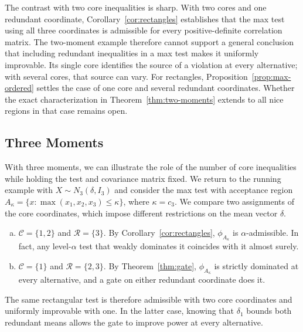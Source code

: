 \documentclass[11pt]{article}
\newcommand{\red}[1]{{\color{red}#1}} %
\numberwithin{equation}{section}
\theoremstyle{definition}
\begin{document}
The contrast with two core inequalities is sharp. With two cores and one redundant coordinate, Corollary~\ref{cor:rectangles} establishes that the max test using all three coordinates is admissible for every positive-definite correlation matrix. The two-moment example therefore cannot support a general conclusion that including redundant inequalities in a max test makes it uniformly improvable. Its single core identifies the source of a violation at every alternative; with several cores, that source can vary. \red{For rectangles, Proposition~\ref{prop:max-ordered} settles the case of one core and several redundant coordinates. Whether the exact characterization in Theorem~\ref{thm:two-moments} extends to all nice regions in that case remains open.}

\subsection{Three Moments}\label{sec:three-moments}

With three moments, we can illustrate the role of the number of core inequalities while holding the test and covariance matrix fixed. We return to the running example with $X\sim N_3(\delta,I_3)$ and consider the max test with acceptance region $A_\kappa=\{x:\max(x_1,x_2,x_3)\le\kappa\}$, where $\kappa=c_3$. We compare two assignments of the core coordinates, which impose different restrictions on the mean vector $\delta$.

\begin{enumerate}[(a)]
\item $\mathcal C=\{1,2\}$ and $\mathcal R=\{3\}$. By Corollary~\ref{cor:rectangles}, $\phi_{A_\kappa}$ is $\alpha$-admissible. In fact, any level-$\alpha$ test that weakly dominates it coincides with it almost surely.
\item $\mathcal C=\{1\}$ and $\mathcal R=\{2,3\}$. By Theorem~\ref{thm:gate}, $\phi_{A_\kappa}$ is strictly dominated at every alternative, and a gate on either redundant coordinate does it.
\end{enumerate}
The same rectangular test is therefore admissible with two core coordinates and uniformly improvable with one. In the latter case, knowing that $\delta_1$ bounds both redundant means allows the gate to improve power at every alternative.
\end{document}
